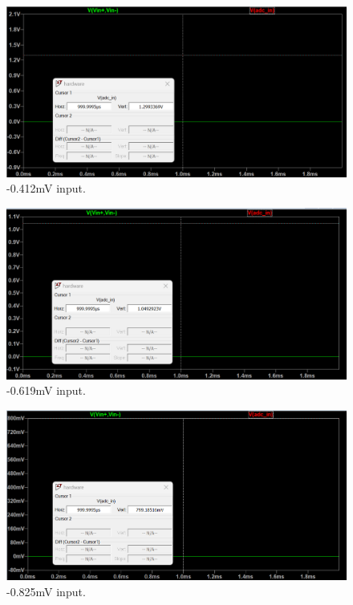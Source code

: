 \begin{figure}[h]
\centering
\includegraphics[width=\textwidth]{proposal/parts/-0.412mV.png}
\caption{-0.412mV input.}
\end{figure}

\begin{figure}[h]
\centering
\includegraphics[width=\textwidth]{proposal/parts/-0.619mV.png}
\caption{-0.619mV input.}
\end{figure}

\begin{figure}[h]
\centering
\includegraphics[width=\textwidth]{proposal/parts/-0.825mV.png}
\caption{-0.825mV input.}
\end{figure}

